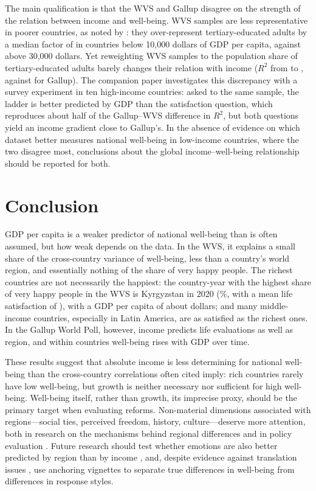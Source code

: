 \documentclass[12pt]{article}
\begin{document}
The main qualification is that the WVS and Gallup disagree on the strength of the relation between income and well-being. WVS samples are less representative in poorer countries, as noted by \citet{deaton_income_2008}: they over-represent tertiary-educated adults by a median factor of \ratioTertiaryLow in countries below 10,000 dollars of GDP per capita, against \ratioTertiaryHigh above 30,000 dollars. Yet reweighting WVS samples to the population share of tertiary-educated adults barely changes their relation with income ($R^2$ from \RtwoCommonWVSraw to \RtwoCommonWVSeduAdj, against \RtwoCommonGallupSub for Gallup). The companion paper  investigates this discrepancy with a survey experiment in ten high-income countries: asked to the same sample, the ladder is better predicted by GDP than the satisfaction question, which reproduces about half of the Gallup--WVS difference in $R^2$, but both questions yield an income gradient close to Gallup's. In the absence of evidence on which dataset better measures national well-being in low-income countries, where the two disagree most, conclusions about the global income--well-being relationship should be reported for both.

\section{Conclusion}\label{sec:conclusion}

GDP per capita is a weaker predictor of national well-being than is often assumed, but how weak depends on the data. In the WVS, it explains a small share of the cross-country variance of well-being, less than a country's world region, and essentially nothing of the share of very happy people. The richest countries are not necessarily the happiest: the country-year with the highest share of very happy people in the WVS is Kyrgyzstan in 2020 (\veryHappyKGZ\%, with a mean life satisfaction of \satisfactionKGZ), with a GDP per capita of about \gdpKGZ dollars; and many middle-income countries, especially in Latin America, are as satisfied as the richest ones. In the Gallup World Poll, however, income predicts life evaluations as well as region, and within countries well-being rises with GDP over time.

These results suggest that absolute income is less determining for national well-being than the cross-country correlations often cited imply: rich countries rarely have low well-being, but growth is neither necessary nor sufficient for high well-being. Well-being itself, rather than growth, its imprecise proxy, should be the primary target when evaluating reforms. Non-material dimensions associated with regions---social ties, perceived freedom, history, culture---deserve more attention, both in research on the mechanisms behind regional differences and in policy evaluation \citep{stiglitz_report_2009,frijters_happy_2020}. Future research should test whether emotions are also better predicted by region than by income \citep{blanchflower_wellbeing_2024,killingsworth_income_2023}, and, despite evidence against translation issues \citep{diener_culture_2000}, use anchoring vignettes to separate true differences in well-being from differences in response styles.
\end{document}
